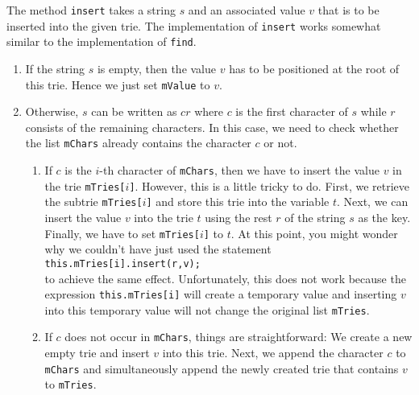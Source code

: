 The method \texttt{insert} takes a string $s$ and an associated value $v$ that is to be inserted
into the given trie.  The implementation of \texttt{insert} works somewhat similar to the
implementation of \texttt{find}.
\begin{enumerate}
\item If the string $s$ is empty, then the value $v$ has to be positioned at the root of this trie.
      Hence we just set \texttt{mValue} to $v$.
\item Otherwise, $s$ can be written as $cr$ where $c$ is the first character of $s$ while $r$
      consists of the remaining characters.  In this case, we need to check whether the list
      \texttt{mChars} already contains the character $c$ or not.
      \begin{enumerate}
      \item If $c$ is the $i$-th character of \texttt{mChars}, then we have to insert the value $v$
            in the trie \texttt{mTries[$i$]}.  However, this is a little tricky to do.
            First, we retrieve the subtrie \texttt{mTries[$i$]} and store this trie into the
            variable $t$.  Next, we can insert the value $v$ into the trie $t$ using the rest $r$ of the
            string $s$ as the key.  Finally, we have to set \texttt{mTries[$i$]} to $t$.  At this point, you
            might wonder why we couldn't have just used the statement
            \\[0.2cm]
            \hspace*{1.3cm}
            \texttt{this.mTries[i].insert(r,v);}
            \\[0.2cm]
            to achieve the same effect. Unfortunately, this does not work because the expression \texttt{this.mTries[i]} will
            create a temporary value and inserting $v$ into this temporary value will not change the
            original list \texttt{mTries}.
       \item If $c$ does not occur in \texttt{mChars}, things are straightforward: We create a new
             empty trie and insert $v$ into this trie.  Next, we append the character $c$ to
             \texttt{mChars} and simultaneously append the newly created trie that contains $v$ to
             \texttt{mTries}. 
      \end{enumerate}
\end{enumerate}

